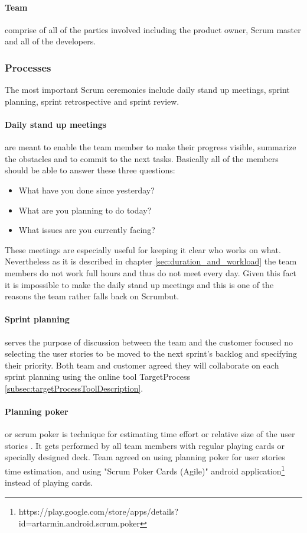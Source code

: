 \paragraph{Team} comprise of all of the parties involved including the product owner, Scrum master and all of the developers.

\subsubsection{Processes}
The most important Scrum ceremonies include daily stand up meetings, sprint planning, sprint retrospective and sprint review.

\paragraph{Daily stand up meetings} are meant to enable the team member to make their progress visible, summarize the obstacles and to commit to the next tasks. Basically all of the members should be able to answer these three questions:

\begin{itemize}
\item What have you done since yesterday?
\item What are you planning to do today?
\item What issues are you currently facing?
\end{itemize}

These meetings are especially useful for keeping it clear who works on what. Nevertheless as it is described in chapter \ref{sec:duration_and_workload} the team members do not work full hours and thus do not meet every day. Given this fact it is impossible to make the daily stand up meetings and this is one of the reasons the team rather falls back on Scrumbut.

\paragraph{Sprint planning} serves the purpose of discussion between the team and the customer focused no selecting the user stories to be moved to the next sprint's backlog and specifying their priority. Both team and customer agreed they will collaborate on each sprint planning using the online tool TargetProcess \ref{subsec:targetProcessToolDescription}.

\paragraph{Planning poker} or scrum poker is technique for estimating time effort or relative size of the user stories \cite{cohn2005agile}. It gets performed by all team members with regular playing cards or specially designed deck. Team agreed on using planning poker for user stories time estimation, and using "Scrum Poker Cards (Agile)" android application\footnote{https://play.google.com/store/apps/details?id=artarmin.android.scrum.poker} instead of playing cards.

